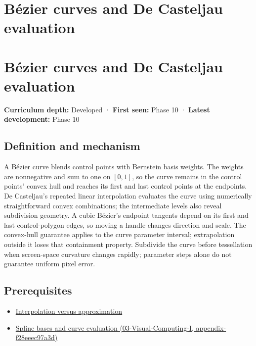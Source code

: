 \hypertarget{appendix-ddbec701898c}{}
\section*{Bézier curves and De Casteljau evaluation}
\section{Bézier curves and De Casteljau evaluation}\label{appendix-ddbec701898c-buxe9zier-curves-and-de-casteljau-evaluation}

\textbf{Curriculum depth:} Developed · \textbf{First seen:} Phase 10 · \textbf{Latest development:} Phase 10

\subsection{Definition and mechanism}\label{appendix-ddbec701898c-definition-and-mechanism}

A Bézier curve blends control points with Bernstein basis weights. The weights are nonnegative and sum to one on \([0,1]\), so the curve remains in the control points' convex hull and reaches its first and last control points at the endpoints. De Casteljau's repeated linear interpolation evaluates the curve using numerically straightforward convex combinations; the intermediate levels also reveal subdivision geometry. A cubic Bézier's endpoint tangents depend on its first and last control-polygon edges, so moving a handle changes direction and scale. The convex-hull guarantee applies to the curve parameter interval; extrapolation outside it loses that containment property. Subdivide the curve before tessellation when screen-space curvature changes rapidly; parameter steps alone do not guarantee uniform pixel error.

\subsection{Prerequisites}\label{appendix-ddbec701898c-prerequisites}

\begin{itemize}
\tightlist
\item
  \hyperref[appendix-0c2a5f69851e]{Interpolation versus approximation}
\item
  \href{../03-Visual-Computing-I/main.pdf\#nameddest=appendix-f28eeec97a3d}{Spline bases and curve evaluation (03-Visual-Computing-I, appendix-f28eeec97a3d)}
\end{itemize}

